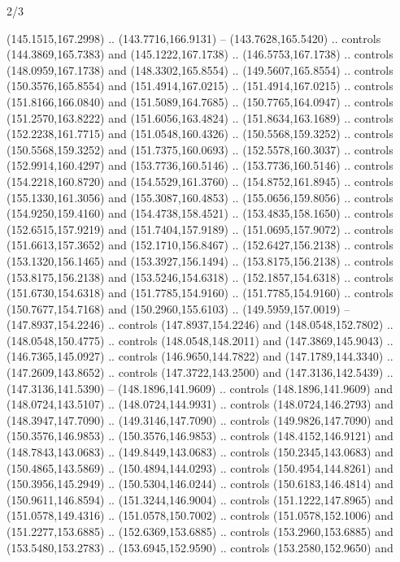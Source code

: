 \begin{flagdescription}{2/3}
\begin{scope}[xshift=0.5\flaglength,yshift=0.5\flagwidth,scale=\flagwidth/180]
\begin{scope}[y=0.8pt, x=0.8pt, yscale=-1,shift={(-168.75,-108.75)}]
  (145.1515,167.2998) .. (143.7716,166.9131) -- (143.7628,165.5420) .. controls
  (144.3869,165.7383) and (145.1222,167.1738) .. (146.5753,167.1738) .. controls
  (148.0959,167.1738) and (148.3302,165.8554) .. (149.5607,165.8554) .. controls
  (150.3576,165.8554) and (151.4914,167.0215) .. (151.4914,167.0215) .. controls
  (151.8166,166.0840) and (151.5089,164.7685) .. (150.7765,164.0947) .. controls
  (151.2570,163.8222) and (151.6056,163.4824) .. (151.8634,163.1689) .. controls
  (152.2238,161.7715) and (151.0548,160.4326) .. (150.5568,159.3252) .. controls
  (150.5568,159.3252) and (151.7375,160.0693) .. (152.5578,160.3037) .. controls
  (152.9914,160.4297) and (153.7736,160.5146) .. (153.7736,160.5146) .. controls
  (154.2218,160.8720) and (154.5529,161.3760) .. (154.8752,161.8945) .. controls
  (155.1330,161.3056) and (155.3087,160.4853) .. (155.0656,159.8056) .. controls
  (154.9250,159.4160) and (154.4738,158.4521) .. (153.4835,158.1650) .. controls
  (152.6515,157.9219) and (151.7404,157.9189) .. (151.0695,157.9072) .. controls
  (151.6613,157.3652) and (152.1710,156.8467) .. (152.6427,156.2138) .. controls
  (153.1320,156.1465) and (153.3927,156.1494) .. (153.8175,156.2138) .. controls
  (153.8175,156.2138) and (153.5246,154.6318) .. (152.1857,154.6318) .. controls
  (151.6730,154.6318) and (151.7785,154.9160) .. (151.7785,154.9160) .. controls
  (150.7677,154.7168) and (150.2960,155.6103) .. (149.5959,157.0019) --
  (147.8937,154.2246) .. controls (147.8937,154.2246) and (148.0548,152.7802) ..
  (148.0548,150.4775) .. controls (148.0548,148.2011) and (147.3869,145.9043) ..
  (146.7365,145.0927) .. controls (146.9650,144.7822) and (147.1789,144.3340) ..
  (147.2609,143.8652) .. controls (147.3722,143.2500) and (147.3136,142.5439) ..
  (147.3136,141.5390) -- (148.1896,141.9609) .. controls (148.1896,141.9609) and
  (148.0724,143.5107) .. (148.0724,144.9931) .. controls (148.0724,146.2793) and
  (148.3947,147.7090) .. (149.3146,147.7090) .. controls (149.9826,147.7090) and
  (150.3576,146.9853) .. (150.3576,146.9853) .. controls (148.4152,146.9121) and
  (148.7843,143.0683) .. (149.8449,143.0683) .. controls (150.2345,143.0683) and
  (150.4865,143.5869) .. (150.4894,144.0293) .. controls (150.4954,144.8261) and
  (150.3956,145.2949) .. (150.5304,146.0244) .. controls (150.6183,146.4814) and
  (150.9611,146.8594) .. (151.3244,146.9004) .. controls (151.1222,147.8965) and
  (151.0578,149.4316) .. (151.0578,150.7002) .. controls (151.0578,152.1006) and
  (151.2277,153.6885) .. (152.6369,153.6885) .. controls (153.2960,153.6885) and
  (153.5480,153.2783) .. (153.6945,152.9590) .. controls (153.2580,152.9650) and

\end{scope}
\end{scope}
\end{flagdescription}
